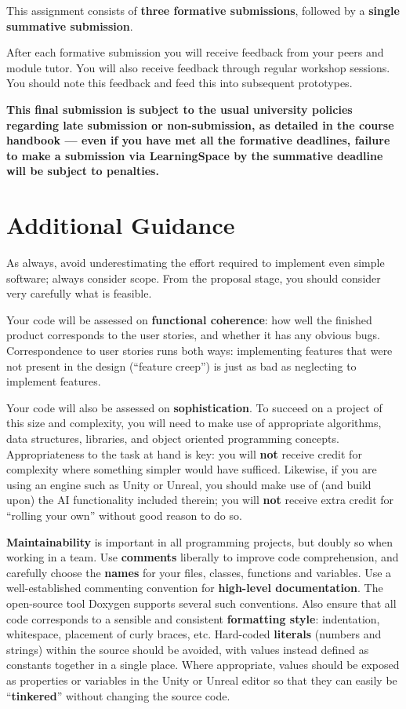 \documentclass{../../fal_assignment}
\begin{document}
This assignment consists of \textbf{three formative submissions}, followed by a \textbf{single summative submission}.

After each formative submission you will receive feedback from your peers and module tutor. You will also receive feedback through regular workshop sessions.
You should note this feedback and feed this into subsequent prototypes.

\textbf{This final submission is subject to the usual university policies regarding late submission or non-submission,
as detailed in the course handbook ---
even if you have met all the formative deadlines,
failure to make a submission via LearningSpace by the summative deadline will be subject to penalties.}

\section*{Additional Guidance}

As always, avoid underestimating the effort required to implement even simple software; always consider scope.
From the proposal stage, you should consider very carefully what is feasible.

Your code will be assessed on \textbf{functional coherence}:
how well the finished product corresponds to the user stories,
and whether it has any obvious bugs.
Correspondence to user stories runs both ways:
implementing features that were not present in the design (``feature creep'')
is just as bad as neglecting to implement features.

Your code will also be assessed on \textbf{sophistication}.
To succeed on a project of this size and complexity,
you will need to make use of appropriate algorithms, data structures, libraries, and object oriented programming concepts.
Appropriateness to the task at hand is key:
you will \textbf{not} receive credit for complexity  
where something simpler would have sufficed.
Likewise, if you are using an engine such as Unity or Unreal,
you should make use of (and build upon) the AI functionality included therein;
you will \textbf{not} receive extra credit for ``rolling your own'' without good reason to do so.

\textbf{Maintainability} is important in all programming projects,
but doubly so when working in a team.
Use \textbf{comments} liberally to improve code comprehension,
and carefully choose the \textbf{names} for your files, classes, functions and variables.
Use a well-established commenting convention
for \textbf{high-level documentation}.
The open-source tool Doxygen supports several such conventions.
Also ensure that all code corresponds to a sensible and consistent \textbf{formatting style}:
indentation, whitespace, placement of curly braces, etc.
Hard-coded \textbf{literals} (numbers and strings) within the source should be avoided,
with values instead defined as constants together in a single place.
Where appropriate, values should be exposed as properties or variables in the Unity or Unreal editor
so that they can easily be ``\textbf{tinkered}'' without changing the source code.
\end{document}
